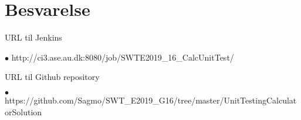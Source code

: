 \section{Besvarelse}

URL til Jenkins 

$\bullet$ http://ci3.ase.au.dk:8080/job/SWTE2019\_16\_CalcUnitTest/ 

\vspace{0.5cm}

URL til Github repository

$\bullet$ https://github.com/Sagmo/SWT\_E2019\_G16/tree/master/UnitTestingCalculatorSolution
